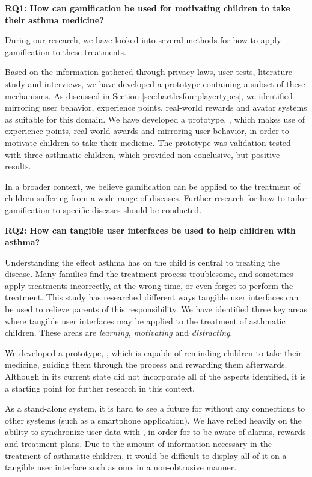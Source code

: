 \textbf{RQ1: How can gamification be used for motivating children to take their asthma medicine?}

During our research, we have looked into several methods for how to apply gamification to these treatments. 

Based on the information gathered through privacy laws, user tests, literature study and interviews, we have developed a prototype containing a subset of these mechanisms. As discussed in Section \ref{sec:bartlesfourplayertypes}, we identified mirroring user behavior, experience points, real-world rewards and avatar systems as suitable for this domain. We have developed a prototype, \app{}, which makes use of experience points, real-world awards and mirroring user behavior, in order to motivate children to take their medicine. The prototype was validation tested with three asthmatic children, which provided non-conclusive, but positive results.

In a broader context, we believe gamification can be applied to the treatment of children suffering from a wide range of diseases. Further research for how to tailor gamification to specific diseases should be conducted.  

\textbf{RQ2: How can tangible user interfaces be used to help children with asthma?}

Understanding the effect asthma has on the child is central to treating the disease. Many families find the treatment process troublesome, and sometimes apply treatments incorrectly, at the wrong time, or even forget to perform the treatment. This study has researched different ways tangible user interfaces can be used to relieve parents of this responsibility. 
We have identified three key areas where tangible user interfaces may be applied to the treatment of asthmatic children. These areas are \emph{learning}, \emph{motivating} and \emph{distracting}. 

We developed a prototype, \ab{}, which is capable of reminding children to take their medicine, guiding them through the process and rewarding them afterwards. Although \ab{} in its current state did not incorporate all of the aspects identified, it is a starting point for further research in this context.   

As a stand-alone system, it is hard to see a future for \ab{} without any connections to other systems (such as a smartphone application). We have relied heavily on the ability to synchronize user data with \app{}, in order for \ab{} to be aware of alarms, rewards and treatment plans. Due to the amount of information necessary in the treatment of asthmatic children, it would be difficult to display all of it on a tangible user interface such as ours in a non-obtrusive manner.  


